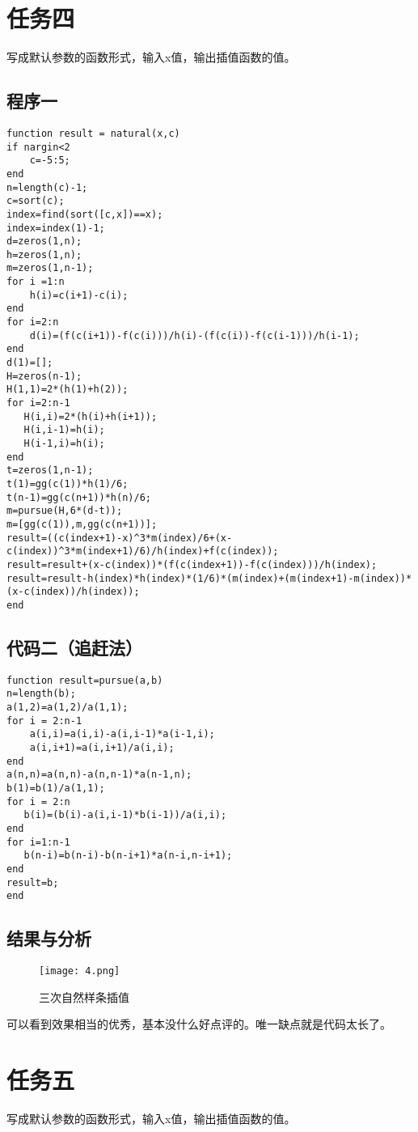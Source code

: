 \documentclass[a4paper,11pt,onecolumn,twoside]{article}
\begin{document}
\section{任务四}
写成默认参数的函数形式，输入x值，输出插值函数的值。
\subsection{程序一}
\begin{lstlisting}
function result = natural(x,c)
if nargin<2
    c=-5:5;
end
n=length(c)-1;
c=sort(c);
index=find(sort([c,x])==x);
index=index(1)-1;
d=zeros(1,n);
h=zeros(1,n);
m=zeros(1,n-1);
for i =1:n
    h(i)=c(i+1)-c(i);
end
for i=2:n
    d(i)=(f(c(i+1))-f(c(i)))/h(i)-(f(c(i))-f(c(i-1)))/h(i-1);
end
d(1)=[];
H=zeros(n-1);
H(1,1)=2*(h(1)+h(2));
for i=2:n-1
   H(i,i)=2*(h(i)+h(i+1));
   H(i,i-1)=h(i);
   H(i-1,i)=h(i);
end
t=zeros(1,n-1);
t(1)=gg(c(1))*h(1)/6;
t(n-1)=gg(c(n+1))*h(n)/6;
m=pursue(H,6*(d-t));
m=[gg(c(1)),m,gg(c(n+1))];
result=((c(index+1)-x)^3*m(index)/6+(x-c(index))^3*m(index+1)/6)/h(index)+f(c(index));
result=result+(x-c(index))*(f(c(index+1))-f(c(index)))/h(index);
result=result-h(index)*h(index)*(1/6)*(m(index)+(m(index+1)-m(index))*(x-c(index))/h(index));
end
\end{lstlisting}
\subsection{代码二（追赶法）}
\begin{lstlisting}
function result=pursue(a,b)
n=length(b);
a(1,2)=a(1,2)/a(1,1);
for i = 2:n-1
    a(i,i)=a(i,i)-a(i,i-1)*a(i-1,i);
    a(i,i+1)=a(i,i+1)/a(i,i);
end
a(n,n)=a(n,n)-a(n,n-1)*a(n-1,n);
b(1)=b(1)/a(1,1);
for i = 2:n
   b(i)=(b(i)-a(i,i-1)*b(i-1))/a(i,i); 
end
for i=1:n-1
   b(n-i)=b(n-i)-b(n-i+1)*a(n-i,n-i+1);
end
result=b;
end
\end{lstlisting}
\subsection{结果与分析}
\begin{figure}[htbp]
  \centering
  \texttt{[image: 4.png]}
  \caption{三次自然样条插值} \label{4}
\end{figure}
可以看到效果相当的优秀，基本没什么好点评的。唯一缺点就是代码太长了。

\section{任务五}
写成默认参数的函数形式，输入x值，输出插值函数的值。
\end{document}
